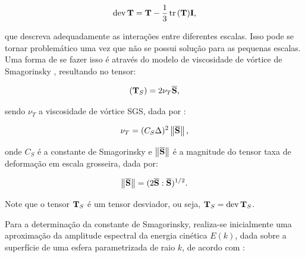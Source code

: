 \begin{equation}
    \mathop{\mathrm{dev}}\nolimits{\mathbf{T}}=\mathbf{T}-\frac{1}{3}\mathop{\mathrm{tr}}\nolimits{(\mathbf{T})}\mathbf{I}\text{,}
\end{equation}

\noindent que descreva adequadamente as interações entre diferentes escalas. Isso pode se tornar problemático uma vez que não se possui solução para as pequenas escalas. Uma forma de se fazer isso é através do modelo de viscosidade de vórtice de Smagorinsky \cite{smagorinsky1963general}, resultando no tensor:

\begin{equation}
    \left({\mathbf{T}_S}\right)=2\nu_T\overline{\mathbf{S}}\text{,}
\end{equation}

\noindent sendo $\nu_T$ a viscosidade de vórtice SGS, dada por \cite{germano1991dynamic,piomelli1999large,hughes2000large,bailly2015turbulence,katopodes2019free}:

\begin{equation}
    \nu_T=(C_S\Delta)^2\left\lVert{\overline{\mathbf{S}}}\right\lVert\text{,}
\end{equation}

\noindent onde $C_S$ é a constante de Smagorinsky e $\left\lVert{\overline{\mathbf{S}}}\right\lVert$ é a magnitude do tensor taxa de deformação em escala grosseira, dada por:

\begin{equation}
    \left\lVert{\overline{\mathbf{S}}}\right\lVert=(2\overline{\mathbf{S}}:\overline{\mathbf{S}})^{1/2}\text{.}
\end{equation}

Note que o tensor $\mathbf{T}_S$ é um tensor desviador, ou seja, $\mathbf{T}_S=\mathop{\mathrm{dev}}\nolimits{\mathbf{T}_S}$.

%

Para a determinação da constante de Smagorinsky, realiza-se inicialmente uma aproximação da amplitude espectral da energia cinética $E(k)$, dada sobre a superfície de uma esfera parametrizada de raio $k$, de acordo com \cite{hughes2000large}:

